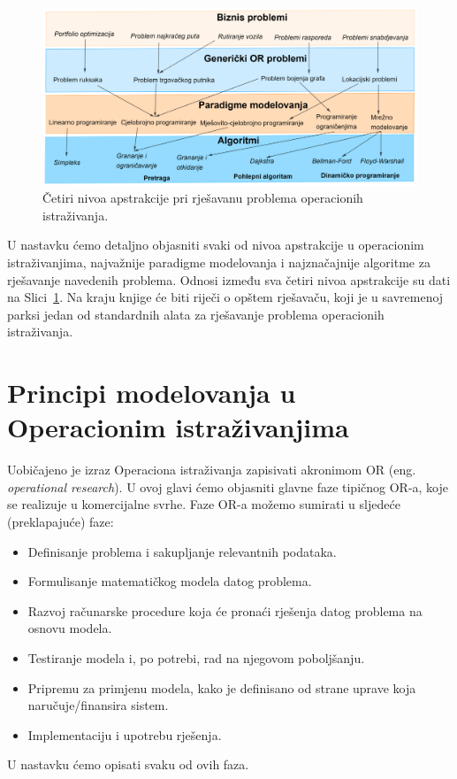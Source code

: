 \documentclass[a4paper, utf8, 11pt, colorlinks]{book}
\theoremstyle{definition}
\begin{document}
\begin{figure}
    \centering
    \includegraphics[width=\textwidth]{overview.eps}
    \caption{Četiri nivoa apstrakcije pri rješavanu problema operacionih istraživanja.}
    \label{fig:OR_four_levels}
\end{figure}


U nastavku ćemo detaljno objasniti svaki od nivoa apstrakcije u operacionim istraživanjima, najvažnije paradigme modelovanja i najznačajnije algoritme za rješavanje navedenih problema. Odnosi između sva četiri nivoa apstrakcije su dati na Slici~\ref{fig:OR_four_levels}. 
 Na kraju knjige će biti riječi o opštem rješavaču, koji je u savremenoj parksi jedan od standardnih alata za rješavanje problema operacionih istraživanja.
 
 
\chapter{Principi modelovanja u Operacionim istraživanjima}
Uobičajeno je izraz Operaciona istraživanja zapisivati akronimom OR (eng. \emph{operational research}). 
U ovoj glavi ćemo objasniti   glavne faze tipičnog OR-a, koje se realizuje u  komercijalne svrhe. Faze OR-a možemo sumirati u sljedeće (preklapajuće) faze: 
\begin{itemize}
    \item Definisanje problema i sakupljanje relevantnih podataka.
    \item Formulisanje matematičkog modela datog problema.
    \item Razvoj računarske procedure koja će pronaći rješenja datog problema na osnovu modela.
    \item Testiranje modela i, po potrebi, rad na njegovom poboljšanju.
    \item Pripremu za primjenu modela, kako je definisano od strane uprave koja naručuje/finansira sistem.
    \item Implementaciju i upotrebu rješenja.
\end{itemize}
 U nastavku ćemo opisati svaku od ovih faza.
 
\end{document}
